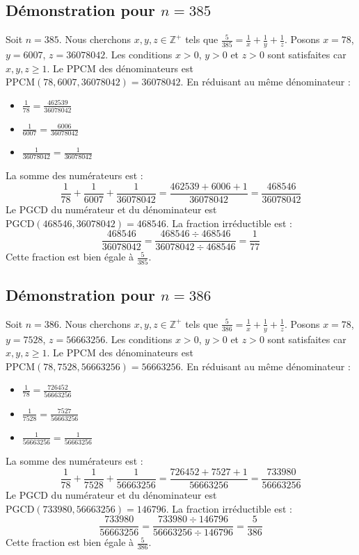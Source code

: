 \documentclass[11pt,a4paper]{article}
\begin{document}
\subsection{Démonstration pour $n = 385$}
Soit $n = 385$. Nous cherchons $x, y, z \in \mathbb{Z}^{+}$ tels que $\frac{5}{385} = \frac{1}{x} + \frac{1}{y} + \frac{1}{z}$.
Posons $x = 78$, $y = 6007$, $z = 36078042$.
Les conditions $x > 0$, $y > 0$ et $z > 0$ sont satisfaites car $x, y, z \geq 1$.
Le PPCM des dénominateurs est $\text{PPCM}(78, 6007, 36078042) = 36078042$.
En réduisant au même dénominateur :
\begin{itemize}
    \item $\frac{1}{78} = \frac{462539}{36078042}$
    \item $\frac{1}{6007} = \frac{6006}{36078042}$
    \item $\frac{1}{36078042} = \frac{1}{36078042}$
\end{itemize}
La somme des numérateurs est :
$$ \frac{1}{78} + \frac{1}{6007} + \frac{1}{36078042} = \frac{462539 + 6006 + 1}{36078042} = \frac{468546}{36078042} $$
Le PGCD du numérateur et du dénominateur est $\text{PGCD}(468546, 36078042) = 468546$.
La fraction irréductible est :
$$ \frac{468546}{36078042} = \frac{468546 \div 468546}{36078042 \div 468546} = \frac{1}{77} $$
Cette fraction est bien égale à $\frac{5}{385}$.

\subsection{Démonstration pour $n = 386$}
Soit $n = 386$. Nous cherchons $x, y, z \in \mathbb{Z}^{+}$ tels que $\frac{5}{386} = \frac{1}{x} + \frac{1}{y} + \frac{1}{z}$.
Posons $x = 78$, $y = 7528$, $z = 56663256$.
Les conditions $x > 0$, $y > 0$ et $z > 0$ sont satisfaites car $x, y, z \geq 1$.
Le PPCM des dénominateurs est $\text{PPCM}(78, 7528, 56663256) = 56663256$.
En réduisant au même dénominateur :
\begin{itemize}
    \item $\frac{1}{78} = \frac{726452}{56663256}$
    \item $\frac{1}{7528} = \frac{7527}{56663256}$
    \item $\frac{1}{56663256} = \frac{1}{56663256}$
\end{itemize}
La somme des numérateurs est :
$$ \frac{1}{78} + \frac{1}{7528} + \frac{1}{56663256} = \frac{726452 + 7527 + 1}{56663256} = \frac{733980}{56663256} $$
Le PGCD du numérateur et du dénominateur est $\text{PGCD}(733980, 56663256) = 146796$.
La fraction irréductible est :
$$ \frac{733980}{56663256} = \frac{733980 \div 146796}{56663256 \div 146796} = \frac{5}{386} $$
Cette fraction est bien égale à $\frac{5}{386}$.
\end{document}
